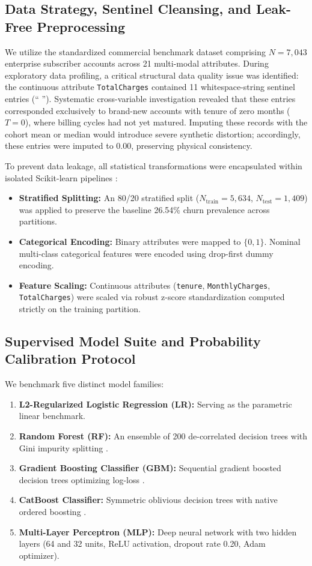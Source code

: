 \documentclass[journal,compsoc]{IEEEtran}
\begin{document}
\subsection{Data Strategy, Sentinel Cleansing, and Leak-Free Preprocessing}
We utilize the standardized commercial benchmark dataset comprising $N = 7,043$ enterprise subscriber accounts across 21 multi-modal attributes. During exploratory data profiling, a critical structural data quality issue was identified: the continuous attribute \texttt{TotalCharges} contained 11 whitespace-string sentinel entries (`` ''). Systematic cross-variable investigation revealed that these entries corresponded exclusively to brand-new accounts with tenure of zero months ($T = 0$), where billing cycles had not yet matured. Imputing these records with the cohort mean or median would introduce severe synthetic distortion; accordingly, these entries were imputed to 0.00, preserving physical consistency.

To prevent data leakage, all statistical transformations were encapsulated within isolated Scikit-learn pipelines \cite{kuhn2019feature, pedregosa2011scikit}:
\begin{itemize}
    \item \textbf{Stratified Splitting:} An 80/20 stratified split ($N_{\text{train}} = 5,634$, $N_{\text{test}} = 1,409$) was applied to preserve the baseline 26.54\% churn prevalence across partitions.
    \item \textbf{Categorical Encoding:} Binary attributes were mapped to $\{0, 1\}$. Nominal multi-class categorical features were encoded using drop-first dummy encoding.
    \item \textbf{Feature Scaling:} Continuous attributes (\texttt{tenure}, \texttt{MonthlyCharges}, \texttt{TotalCharges}) were scaled via robust z-score standardization computed strictly on the training partition.
\end{itemize}

\subsection{Supervised Model Suite and Probability Calibration Protocol}
We benchmark five distinct model families:
\begin{enumerate}
    \item \textbf{L2-Regularized Logistic Regression (LR):} Serving as the parametric linear benchmark.
    \item \textbf{Random Forest (RF):} An ensemble of 200 de-correlated decision trees with Gini impurity splitting \cite{breiman2001random}.
    \item \textbf{Gradient Boosting Classifier (GBM):} Sequential gradient boosted decision trees optimizing log-loss \cite{chen2016xgboost}.
    \item \textbf{CatBoost Classifier:} Symmetric oblivious decision trees with native ordered boosting \cite{dorogush2018catboost}.
    \item \textbf{Multi-Layer Perceptron (MLP):} Deep neural network with two hidden layers (64 and 32 units, ReLU activation, dropout rate 0.20, Adam optimizer).
\end{enumerate}
\end{document}
